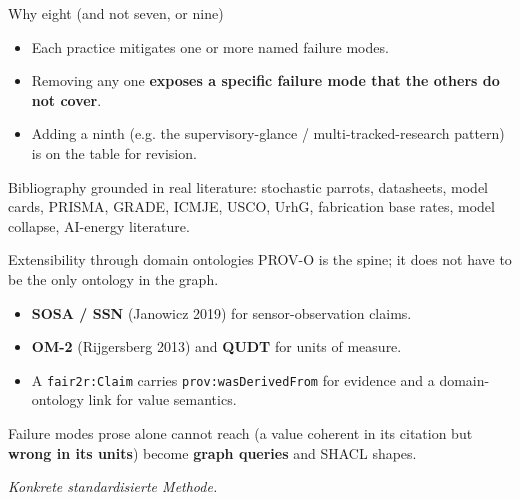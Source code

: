 \documentclass[aspectratio=169,11pt]{beamer}
\begin{document}
\begin{frame}{Why eight (and not seven, or nine)}
  \begin{itemize}
    \item Each practice mitigates one or more named failure modes.
    \item Removing any one \textbf{exposes a specific failure mode that the others do not cover}.
    \item Adding a ninth (e.g. the supervisory-glance / multi-tracked-research pattern) is on the table for revision.
  \end{itemize}

  \vspace{0.4em}
  Bibliography grounded in real literature: stochastic parrots, datasheets,
  model cards, PRISMA, GRADE, ICMJE, USCO, UrhG, fabrication base rates,
  model collapse, AI-energy literature.
\end{frame}


\begin{frame}{Extensibility through domain ontologies}
  PROV-O is the spine; it does not have to be the only ontology in the graph.

  \begin{itemize}
    \item \textbf{SOSA / SSN} (Janowicz 2019) for sensor-observation claims.
    \item \textbf{OM-2} (Rijgersberg 2013) and \textbf{QUDT} for units of measure.
    \item A \texttt{fair2r:Claim} carries \texttt{prov:wasDerivedFrom} for evidence and a domain-ontology link for value semantics.
  \end{itemize}

  \vspace{0.4em}
  Failure modes prose alone cannot reach (a value coherent in its citation but
  \textbf{wrong in its units}) become \textbf{graph queries} and SHACL shapes.

  \vspace{0.3em}
  \emph{Konkrete standardisierte Methode.}
\end{frame}
\end{document}
